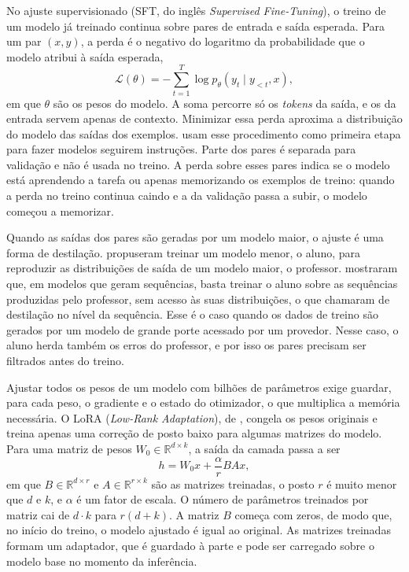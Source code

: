 No ajuste supervisionado (SFT, do inglês \textit{Supervised Fine-Tuning}), o treino de um modelo já treinado continua sobre pares de entrada e saída esperada. Para um par $(x, y)$, a perda é o negativo do logaritmo da probabilidade que o modelo atribui à saída esperada,
\begin{equation}
	\mathcal{L}(\theta) = -\sum_{t=1}^{T} \log p_{\theta}(y_t \mid y_{<t}, x),
\end{equation}
em que $\theta$ são os pesos do modelo. A soma percorre só os \textit{tokens} da saída, e os da entrada servem apenas de contexto. Minimizar essa perda aproxima a distribuição do modelo das saídas dos exemplos.  usam esse procedimento como primeira etapa para fazer modelos seguirem instruções. Parte dos pares é separada para validação e não é usada no treino. A perda sobre esses pares indica se o modelo está aprendendo a tarefa ou apenas memorizando os exemplos de treino: quando a perda no treino continua caindo e a da validação passa a subir, o modelo começou a memorizar.

Quando as saídas dos pares são geradas por um modelo maior, o ajuste é uma forma de destilação.  propuseram treinar um modelo menor, o aluno, para reproduzir as distribuições de saída de um modelo maior, o professor.  mostraram que, em modelos que geram sequências, basta treinar o aluno sobre as sequências produzidas pelo professor, sem acesso às suas distribuições, o que chamaram de destilação no nível da sequência. Esse é o caso quando os dados de treino são gerados por um modelo de grande porte acessado por um provedor. Nesse caso, o aluno herda também os erros do professor, e por isso os pares precisam ser filtrados antes do treino.

Ajustar todos os pesos de um modelo com bilhões de parâmetros exige guardar, para cada peso, o gradiente e o estado do otimizador, o que multiplica a memória necessária. O LoRA (\textit{Low-Rank Adaptation}), de , congela os pesos originais e treina apenas uma correção de posto baixo para algumas matrizes do modelo. Para uma matriz de pesos $W_0 \in \mathbb{R}^{d \times k}$, a saída da camada passa a ser
\begin{equation}
	h = W_0 x + \frac{\alpha}{r} B A x,
\end{equation}
em que $B \in \mathbb{R}^{d \times r}$ e $A \in \mathbb{R}^{r \times k}$ são as matrizes treinadas, o posto $r$ é muito menor que $d$ e $k$, e $\alpha$ é um fator de escala. O número de parâmetros treinados por matriz cai de $d \cdot k$ para $r(d + k)$. A matriz $B$ começa com zeros, de modo que, no início do treino, o modelo ajustado é igual ao original. As matrizes treinadas formam um adaptador, que é guardado à parte e pode ser carregado sobre o modelo base no momento da inferência.

